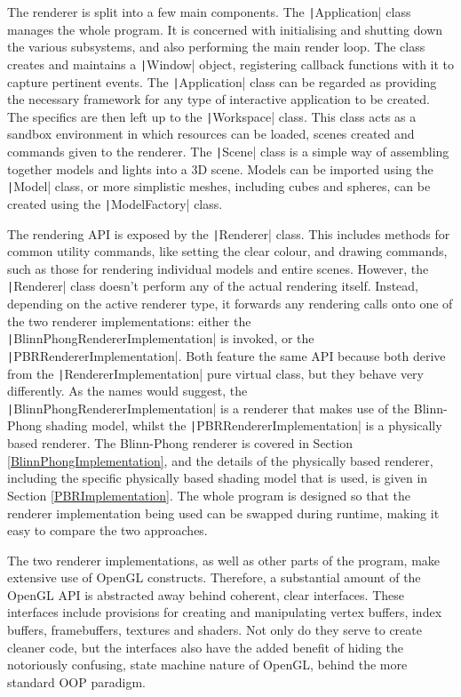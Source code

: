 The renderer is split into a few main components. The \texttt|Application| class manages the whole program. It is concerned with initialising and shutting down the various subsystems, and also performing the main render loop. The class creates and maintains a \texttt|Window| object, registering callback functions with it to capture pertinent events. The \texttt|Application| class can be regarded as providing the necessary framework for any type of interactive application to be created. The specifics are then left up to the \texttt|Workspace| class. This class acts as a sandbox environment in which resources can be loaded, scenes created and commands given to the renderer. The \texttt|Scene| class is a simple way of assembling together models and lights into a 3D scene. Models can be imported using the \texttt|Model| class, or more simplistic meshes, including cubes and spheres, can be created using the \texttt|ModelFactory| class.

The rendering API is exposed by the \texttt|Renderer| class. This includes methods for common utility commands, like setting the clear colour, and drawing commands, such as those for rendering individual models and entire scenes. However, the \texttt|Renderer| class doesn't perform any of the actual rendering itself. Instead, depending on the active renderer type, it forwards any rendering calls onto one of the two renderer implementations: either the \texttt|BlinnPhongRendererImplementation| is invoked, or the \texttt|PBRRendererImplementation|. Both feature the same API because both derive from the \texttt|RendererImplementation| pure virtual class, but they behave very differently. As the names would suggest, the \texttt|BlinnPhongRendererImplementation| is a renderer that makes use of the Blinn-Phong shading model, whilst the \texttt|PBRRendererImplementation| is a physically based renderer. The Blinn-Phong renderer is covered in Section \ref{BlinnPhongImplementation}, and the details of the physically based renderer, including the specific physically based shading model that is used, is given in Section \ref{PBRImplementation}. The whole program is designed so that the renderer implementation being used can be swapped during runtime, making it easy to compare the two approaches.

The two renderer implementations, as well as other parts of the program, make extensive use of OpenGL constructs. Therefore, a substantial amount of the OpenGL API is abstracted away behind coherent, clear interfaces. These interfaces include provisions for creating and manipulating vertex buffers, index buffers, framebuffers, textures and shaders. Not only do they serve to create cleaner code, but the interfaces also have the added benefit of hiding the notoriously confusing, state machine nature of OpenGL, behind the more standard OOP paradigm.

